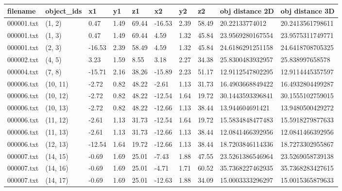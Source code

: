 \documentclass[a4paper, 11pt]{article}
\begin{document}
\begin{multicols}{2}
\begin{table*}[!ht]
\begin{subtable}[c]{\linewidth}
\centering
{}
\tiny
    \begin{tabular}{|l|l|l|l|l|l|l|l|l|l|}
    \hline
        filename & object\_ids & x1 & y1 & z1 & x2 & y2 & z2 & obj distance 2D & obj distance 3D \\ \hline
        000001.txt & (1, 2) & 0.47 & 1.49 & 69.44 & -16.53 & 2.39 & 58.49 & 20.22133774012 & 20.2413561798611 \\ \hline
        000001.txt & (1, 3) & 0.47 & 1.49 & 69.44 & 4.59 & 1.32 & 45.84 & 23.9569280167554 & 23.9575311749771 \\ \hline
        000001.txt & (2, 3) & -16.53 & 2.39 & 58.49 & 4.59 & 1.32 & 45.84 & 24.6186291251158 & 24.6418708705325 \\ \hline
        000002.txt & (4, 5) & 3.23 & 1.59 & 8.55 & 3.18 & 2.27 & 34.38 & 25.8300483932957 & 25.838997658578 \\ \hline
        000004.txt & (7, 8) & -15.71 & 2.16 & 38.26 & -15.89 & 2.23 & 51.17 & 12.9112547802295 & 12.9114445357597 \\ \hline
        000006.txt & (10, 11) & -2.72 & 0.82 & 48.22 & -2.61 & 1.13 & 31.73 & 16.4903668849422 & 16.4932804499287 \\ \hline
        000006.txt & (10, 12) & -2.72 & 0.82 & 48.22 & -12.54 & 1.64 & 19.72 & 30.1443593396841 & 30.1555102759015 \\ \hline
        000006.txt & (10, 13) & -2.72 & 0.82 & 48.22 & -12.66 & 1.13 & 38.44 & 13.944604691421 & 13.9480500429272 \\ \hline
        000006.txt & (11, 12) & -2.61 & 1.13 & 31.73 & -12.54 & 1.64 & 19.72 & 15.5834848477483 & 15.5918279877633 \\ \hline
        000006.txt & (11, 13) & -2.61 & 1.13 & 31.73 & -12.66 & 1.13 & 38.44 & 12.0841466392956 & 12.0841466392956 \\ \hline
        000006.txt & (12, 13) & -12.54 & 1.64 & 19.72 & -12.66 & 1.13 & 38.44 & 18.7203846114336 & 18.7273302955867 \\ \hline
        000007.txt & (14, 15) & -0.69 & 1.69 & 25.01 & -7.43 & 1.88 & 47.55 & 23.5261386546964 & 23.5269058739138 \\ \hline
        000007.txt & (14, 16) & -0.69 & 1.69 & 25.01 & -4.71 & 1.71 & 60.52 & 35.7368227462935 & 35.7368283427615 \\ \hline
        000007.txt & (14, 17) & -0.69 & 1.69 & 25.01 & -12.63 & 1.88 & 34.09 & 15.0003333296297 & 15.0015365879633 \\ \hline

\end{tabular}
\end{subtable}
\end{table*}
\end{multicols}
\end{document}
